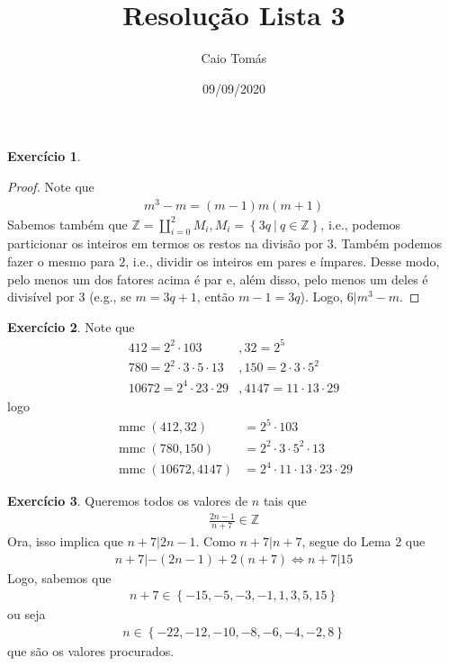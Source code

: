 \documentclass[a4paper,12pt]{article}
\title{Resolução Lista 3}
\date{09/09/2020}
\author{Caio Tomás}
\DeclareMathOperator{\mmc}{mmc}
\theoremstyle{definition}
\newtheorem{exercise}{Exercício}%
\begin{document}
	\maketitle
	\begin{exercise}
		\begin{proof}
		Note que 
		\begin{align*}
		m^3 - m = (m-1)m(m+1)
		\end{align*}
		Sabemos também que $\mathbb{Z} = \displaystyle{\coprod_{i=0}^{2}} M_i, M_i = \left\{3q \ | \ q\in\mathbb{Z} \right\}$, i.e., podemos particionar os inteiros em termos os restos na divisão por $3$. Também podemos fazer o mesmo para $2$, i.e., dividir os inteiros em pares e ímpares. Desse modo, pelo menos um dos fatores acima é par e, além disso, pelo menos um deles é divisível por $3$ (e.g., se $m = 3q+1$, então $m-1=3q$). Logo, $6|m^3-m$.
	\end{proof}
	\end{exercise}
	\begin{exercise}
		Note que 
		\begin{align*}
		412 = 2^2\cdot 103&, 32 = 2^5 \\
		780 = 2^2\cdot 3\cdot 5\cdot 13&, 150 = 2\cdot 3\cdot 5^2 \\
		10672 = 2^4\cdot 23\cdot 29&, 4147 = 11\cdot 13\cdot 29 
		\end{align*}
		logo
		\begin{align*}
		\mmc(412, 32) &= 2^5\cdot 103\\
		\mmc(780, 150) &= 2^2\cdot 3\cdot 5^2\cdot 13 \\
		\mmc(10672, 4147) &= 2^4\cdot 11\cdot 13\cdot 23\cdot 29
		\end{align*}
	\end{exercise}
	\begin{exercise}
		Queremos todos os valores de $n$ tais que
		\begin{align*}
		\frac{2n - 1}{n + 7}\in\mathbb{Z}
		\end{align*}
		Ora, isso implica que $n+7|2n - 1$. Como $n+7|n+7$, segue do Lema 2 que
		\begin{align*}
		n+7|-(2n-1) + 2(n+7) \Leftrightarrow n+7|15
		\end{align*}
		Logo, sabemos que
		\begin{align*}
		n+7\in\left\{-15, -5, -3, -1, 1, 3, 5, 15 \right\}
		\end{align*}
		ou seja
		\begin{align*}
		n\in\left\{ -22, -12, -10, -8, -6, -4, -2, 8  \right\}
		\end{align*}
		que são os valores procurados.
	\end{exercise}
\end{document}
